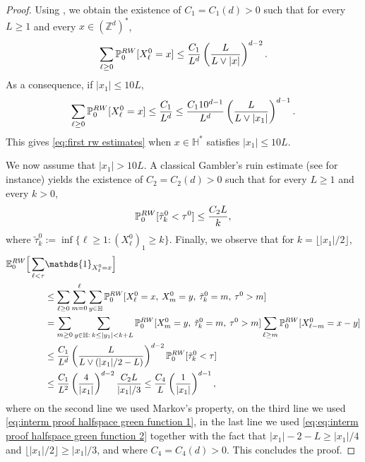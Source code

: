 \documentclass[11pt,a4paper]{article}
\numberwithin{equation}{section}
\theoremstyle{plain}
\theoremstyle{definition}
\begin{document}
\begin{proof} Using \cite{UchiyamaGreenFunctionEstimates1998}, we obtain the existence of $C_1=C_1(d)>0$ such that for every $L\geq 1$ and every $x\in (\mathbb Z^d)^*$,
\begin{equation}\label{eq:interm proof halfspace green function 1}
	\sum_{\ell\geq 0}\mathbb P_0^{\rm RW}[X_\ell^0=x]\leq \frac{C_1}{L^d}\left(\frac{L}{L\vee |x|}\right)^{d-2}.
\end{equation}
As a consequence, if $|x_1|\leq 10L$,
\begin{equation}\label{eq:interm proof halfspace green function 1.5}
	\sum_{\ell\geq 0}\mathbb P_0^{\rm RW}[X_\ell^0=x]\leq \frac{C_1}{L^d}\leq \frac{C_1 10^{d-1}}{L^d}\left(\frac{L}{L\vee |x_1|}\right)^{d-1}.
\end{equation}
This gives \eqref{eq:first rw estimates} when $x\in \mathbb H^*$ satisfies $|x_1|\leq 10L$.

We now assume that $|x_1|>10L$. A classical Gambler's ruin estimate (see for instance\cite[Chapter~5.1.1]{LawlerLimicRandomWalks2010}) yields the existence of $C_2=C_2(d)>0$ such that for every $L\geq 1$ and every $k>0$,
\begin{equation}\label{eq:eq:interm proof halfspace green function 2}
	\mathbb P_0^{\rm RW}[\tilde{\tau}_k^0<\tau^0]\leq \frac{C_2 L}{k},
\end{equation}
where $\tilde{\tau}_k^0:=\inf\{\ell\geq 1: (X_\ell^0)_1\geq k\}$. 
Finally, we observe that for $k=\lfloor |x_1|/2\rfloor$,
\begin{align}\notag
	\mathbb E_0^{\rm RW}\Big[\sum_{\ell<\tau}&\mathds{1}_{X_\ell^0=x}\Big]\\&\leq\sum_{\ell \geq 0}\sum_{m=0}^\ell\sum_{y\in \mathbb H}\mathbb P_0^{\rm RW}[X_\ell^0=x, \: X_m^0=y, \: \tilde{\tau}^0_k=m, \: \tau^0>m]\notag
	\\&=\sum_{m\geq 0}\sum_{y\in \mathbb H: \:k\leq |y_1|<k+L}\mathbb P_0^{\rm RW}[X_m^0=y, \: \tilde{\tau}_k^0=m, \: \tau^0>m]\sum_{\ell\geq m}\mathbb P_0^{\rm RW}[X_{\ell-m}^0=x-y]\notag
	\\&\leq \frac{C_1}{L^d}\left(\frac{L}{L\vee (|x_1|/2-L)}\right)^{d-2}\mathbb P_0^{\rm RW}[\tilde{\tau}_k^0<\tau]\notag
	\\&\leq \frac{C_1}{L^2}\left(\frac{4}{|x_1|}\right)^{d-2}\frac{C_2L}{|x_1|/3}\leq \frac{C_4}{L}\left(\frac{1}{|x_1|}\right)^{d-1},
\end{align}
where on the second line we used Markov's property, on the third line we used \eqref{eq:interm proof halfspace green function 1}, in the last line we used \eqref{eq:eq:interm proof halfspace green function 2} together with the fact that $|x_1|-2-L\geq |x_1|/4$ and $\lfloor |x_1|/2\rfloor\geq |x_1|/3$, and where $C_4=C_4(d)>0$. This concludes the proof.
\end{proof}
\end{document}
